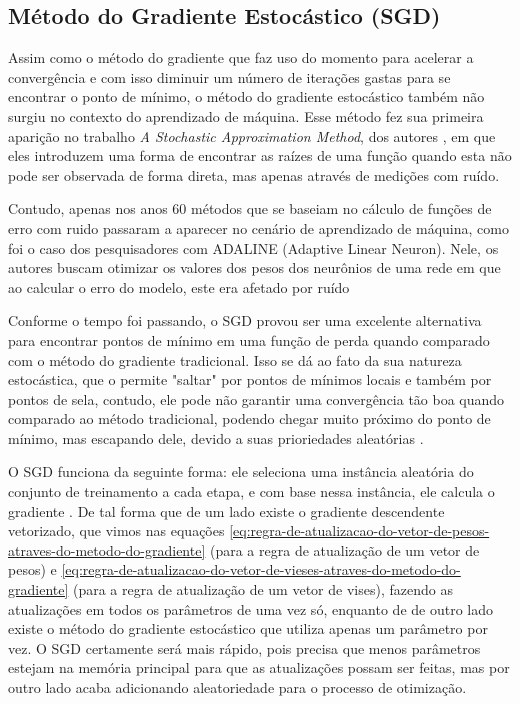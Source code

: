 \subsection{Método do Gradiente Estocástico (SGD)}

Assim como o método do gradiente que faz uso do momento para acelerar a convergência e com isso diminuir um número de iterações gastas para se encontrar o ponto de mínimo, o método do gradiente estocástico também não surgiu no contexto do aprendizado de máquina. Esse método fez sua primeira aparição no trabalho \textit{A Stochastic Approximation Method}, dos autores \textcite{StochasticGradientDescentMethod}, em que eles introduzem uma forma de encontrar as raízes de uma função quando esta não pode ser observada de forma direta, mas apenas através de medições com ruído.

Contudo, apenas nos anos 60 métodos que se baseiam no cálculo de funções de erro com ruido passaram a aparecer no cenário de aprendizado de máquina, como foi o caso dos pesquisadores \textcite{Adeline} com ADALINE (Adaptive Linear Neuron). Nele, os autores buscam otimizar os valores dos pesos dos neurônios de uma rede em que ao calcular o erro do modelo, este era afetado por ruído \parencite{Adeline}

Conforme o tempo foi passando, o SGD provou ser uma excelente alternativa para encontrar pontos de mínimo em uma função de perda quando comparado com o método do gradiente tradicional. Isso se dá ao fato da sua natureza estocástica, que o permite "saltar" por pontos de mínimos locais e também por pontos de sela, contudo, ele pode não garantir uma convergência tão boa quando comparado ao método tradicional, podendo chegar muito próximo do ponto de mínimo, mas escapando dele, devido a suas prioriedades aleatórias \parencite{MaosAObra}.

O SGD funciona da seguinte forma: ele seleciona uma instância aleatória do conjunto de treinamento a cada etapa, e com base nessa instância, ele calcula o gradiente \parencite{MaosAObra}. De tal forma que de um lado existe o gradiente descendente vetorizado, que vimos nas equações \ref{eq:regra-de-atualizacao-do-vetor-de-pesos-atraves-do-metodo-do-gradiente} (para a regra de atualização de um vetor de pesos) e \ref{eq:regra-de-atualizacao-do-vetor-de-vieses-atraves-do-metodo-do-gradiente} (para a regra de atualização de um vetor de vises), fazendo as atualizações em todos os parâmetros de uma vez só, enquanto de de outro lado existe o método do gradiente estocástico que utiliza apenas um parâmetro por vez. O SGD certamente será mais rápido, pois precisa que menos parâmetros estejam na memória principal para que as atualizações possam ser feitas, mas por outro lado acaba adicionando aleatoriedade para o processo de otimização.

